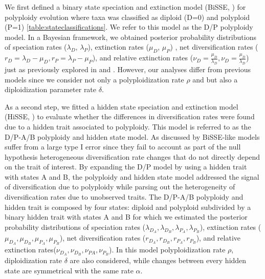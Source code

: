 
We first defined a binary state speciation and extinction model (BiSSE, \citet{maddison_2007})  for polyploidy evolution where taxa was classified as diploid (D=0) and polyploid (P=1) \cref{table:stateclassifications}. 
We refer to this model as the D/P polyploidy model. 
In a Bayesian framework, we obtained posterior probability distributions of speciation rates ($\lambda_D$, $\lambda_P$), extinction rates ($\mu_D$, $\mu_P$) , net diversification rates ($r_D=\lambda_D-\mu_D, r_P=\lambda_P-\mu_P$), and  relative extinction rates ($\nu_D=\frac{\mu_D}{\lambda_D}, \nu_D=\frac{\mu_D}{\lambda_D}$) just as previously explored in \citet{mayrose_2011} and \citet{mayrose_2015}. However, our analyses differ from previous models since we consider not only a polyploidization rate $\rho$ and but also a diploidization parameter rate $\delta$. 

As a second step, we fitted a hidden state speciation and extinction model (HiSSE, \citet{beaulieu_2016}) to evaluate whether the differences in diversification rates were found due to a hidden trait associated to polyploidy.
This model is referred to as the D/P-A/B polyploidy and hidden state model.
As discussed by \citet{beaulieu_2016} BiSSE-like models suffer from a large type I error since they fail to account as part of the null hypothesis heterogeneous diversification rate changes  that do not directly depend on the trait of interest.
By expanding the D/P model by using a hidden trait with states A and B,  the polyploidy and hidden state model addressed the signal of diversification due to polyploidy while parsing out the heterogeneity of diversification rates due to unobserved traits.
The D/P-A/B polyploidy and hidden trait is composed by four states: diploid and polyploid subdivided by a binary hidden trait with states A and B for which we estimated the posterior probability distributions of speciation rates ($\lambda_{D_A},\lambda_{D_B}, \lambda_{P_A},\lambda_{P_B}$), extinction rates ($\mu_{D_A},\mu_{D_B}, \mu_{P_A},\mu_{P_B}$),  net diversification rates ($r_{D_A},r_{D_B},r_{P_A},r_{P_B}$), and relative extinction rates($\nu_{D_A},\nu_{D_B}, \nu_{PA},\nu_{P_B}$). In this model polyploidization rate $\rho$, diploidization rate $\delta$ are also considered, while changes between every hidden state are symmetrical with the same rate $\alpha$.

